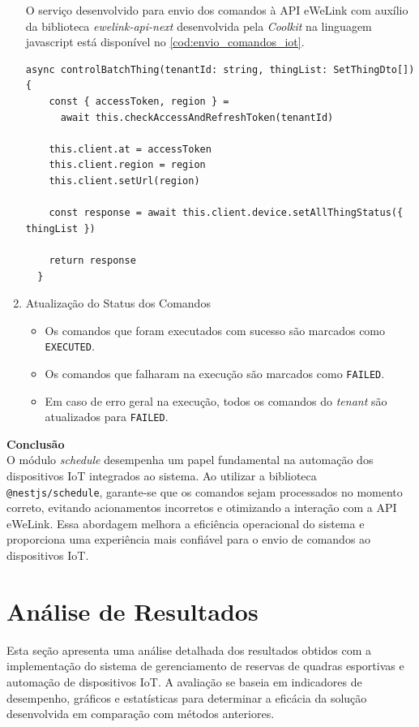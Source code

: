 \begin{enumerate}
  O serviço desenvolvido para envio dos comandos à \acrshort{API} eWeLink com auxílio da biblioteca \textit{ewelink-api-next} desenvolvida pela \textit{Coolkit} na linguagem javascript está disponível no \autoref{cod:envio_comandos_iot}.

  \begin{lstlisting}[caption={Serviço para envio de comandos IoT à \acrshort{API} eWeLink.},label={cod:envio_comandos_iot}]
    async controlBatchThing(tenantId: string, thingList: SetThingDto[]) {
    const { accessToken, region } =
      await this.checkAccessAndRefreshToken(tenantId)

    this.client.at = accessToken
    this.client.region = region
    this.client.setUrl(region)

    const response = await this.client.device.setAllThingStatus({ thingList })

    return response
  }
  \end{lstlisting}
  
  \item Atualização do Status dos Comandos
  \begin{itemize}
      \item Os comandos que foram executados com sucesso são marcados como \texttt{EXECUTED}.
      \item Os comandos que falharam na execução são marcados como \texttt{FAILED}.
      \item Em caso de erro geral na execução, todos os comandos do \textit{tenant} são atualizados para \texttt{FAILED}.
  \end{itemize}
\end{enumerate}

\noindent\textbf{Conclusão}\\
O módulo \textit{schedule} desempenha um papel fundamental na automação dos dispositivos IoT integrados ao sistema. Ao utilizar a biblioteca \texttt{@nestjs/schedule}, garante-se que os comandos sejam processados no momento correto, evitando acionamentos incorretos e otimizando a interação com a API eWeLink. Essa abordagem melhora a eficiência operacional do sistema e proporciona uma experiência mais confiável para o envio de comandos ao dispositivos IoT.

\section{Análise de Resultados}\label{sec:analise_resultados}

Esta seção apresenta uma análise detalhada dos resultados obtidos com a implementação do sistema de gerenciamento de reservas de quadras esportivas e automação de dispositivos IoT. A avaliação se baseia em indicadores de desempenho, gráficos e estatísticas para determinar a eficácia da solução desenvolvida em comparação com métodos anteriores.


